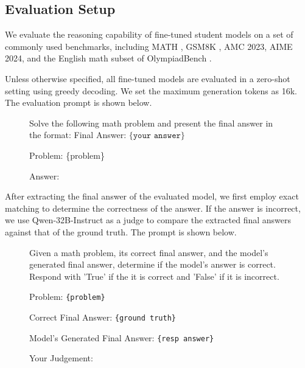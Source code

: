 \subsection{Evaluation Setup} 


We evaluate the reasoning capability of fine-tuned student models on a set of commonly used benchmarks, including MATH \citep{hendrycks2021measuringmathematicalproblemsolving}, GSM8K \citep{cobbe2021trainingverifierssolvemath}, AMC 2023, AIME 2024, and the English math subset of OlympiadBench \citep{he2024olympiadbenchchallengingbenchmarkpromoting}. 

Unless otherwise specified, all fine-tuned models are evaluated in a zero-shot setting using greedy decoding. We set the maximum generation tokens as 16k. The evaluation prompt is shown below. 


\begin{figure}[htbp]
    \centering
\begin{tcolorbox}[title=Prompt, promptstyle]
\lstset{
    basicstyle=\normalfont\sffamily\footnotesize,
    breaklines=true,
    frame=none,
    columns=fullflexible,
}
Solve the following math problem and present the final answer in the format: Final Answer: $\boxed{\{\texttt{your answer}\}}$

Problem: \{problem\}

Answer:
\end{tcolorbox}
    \label{fig: evaluation_prompt}
\end{figure}


After extracting the final answer of the evaluated model, we first employ exact matching to determine the correctness of the answer. If the answer is incorrect, we use Qwen-32B-Instruct as a judge to compare the extracted final answers against that of the ground truth. The prompt is shown below.


\begin{figure}[htbp]
    \centering
\begin{tcolorbox}[title=Prompt, promptstyle]
\lstset{
    basicstyle=\normalfont\sffamily\footnotesize,
    breaklines=true,
    frame=none,
    columns=fullflexible,
}
Given a math problem, its correct final answer, and the model's generated final answer, determine if the model's answer is correct. Respond with 'True' if the it is correct and 'False' if it is incorrect. 

Problem: \texttt{\{problem\}}

Correct Final Answer: \texttt{\{ground truth\}}

Model's Generated Final Answer: \texttt{\{resp answer\}}

Your Judgement:
\end{tcolorbox}
    \label{fig: score_prompt}
\end{figure}





            



